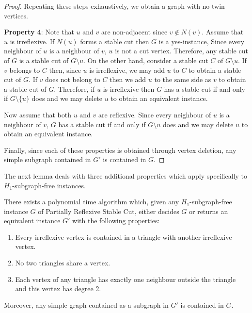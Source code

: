 \documentclass[a4paper,UKenglish,cleveref, autoref,thm-restate]{lipics-v2021}
\begin{document}
\begin{proof}
Repeating these steps exhaustively, we obtain a graph with no twin vertices.

\textbf{Property 4}:
Note that $u$ and $v$ are non-adjacent since $v \notin N(v)$. Assume that $u$ is irreflexive. If $N(u)$ forms a stable cut then $G$ is a yes-instance, Since every neighbour of $u$ is a neighbour of $v$, $u$ is not a cut vertex. Therefore, any stable cut of $G$ is a stable cut of $G \setminus u $. On the other hand, consider a stable cut $C$ of $G \setminus u$. If $v$ belongs to $C$ then, since $u$ is irreflexive, we may add $u$ to $C$ to obtain a stable cut of $G$. If $v$ does not belong to $C$ then we add $u$ to the same side as $v$ to obtain a stable cut of $G$. Therefore, if $u$ is irreflexive then $G$ has a stable cut if and only if $G \setminus \{u\}$ does and we may delete $u$ to obtain an equivalent instance.

Now assume that both $u$ and $v$ are reflexive. Since every neighbour of $u$ is a neighbour of $v$, $G$ has a stable cut if and only if $G \setminus u$ does and we may delete $u$ to obtain an equivalent instance.

Finally, since each of these properties is obtained through vertex deletion, any simple subgraph contained in $G'$ is contained in $G$.%
\end{proof}

The next lemma deals with three additional properties which apply specifically to $H_1$-subgraph-free instances.

\begin{lemma}\label{lem:H-obs}
There exists a polynomial time algorithm which, given any $H_1$-subgraph-free instance $G$ of {\sc Partially Reflexive Stable Cut}, either decides $G$ or returns an equivalent instance $G'$ with the following properties:
\begin{enumerate}
\item[h1.] Every irreflexive vertex is contained in a triangle with another irreflexive vertex.
\item[h2.] No two triangles share a vertex.
\item[h3.] Each vertex of any triangle has exactly one neighbour outside the triangle and this vertex has degree 2.
\end{enumerate}

Moreover, any simple graph contained as a subgraph in $G'$ is contained in $G$.
\end{lemma}
\end{document}
